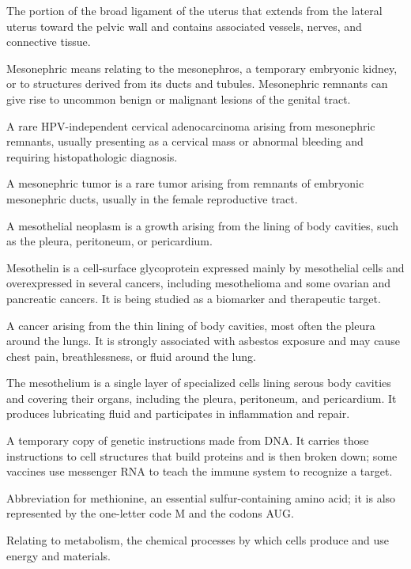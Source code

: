  The portion of the broad ligament of the uterus that extends from the lateral uterus toward the pelvic wall and contains associated vessels, nerves, and connective tissue.

 Mesonephric means relating to the mesonephros, a temporary embryonic kidney, or to structures derived from its ducts and tubules. Mesonephric remnants can give rise to uncommon benign or malignant lesions of the genital tract.

 A rare HPV-independent cervical adenocarcinoma arising from mesonephric remnants, usually presenting as a cervical mass or abnormal bleeding and requiring histopathologic diagnosis.

 A mesonephric tumor is a rare tumor arising from remnants of embryonic mesonephric ducts, usually in the female reproductive tract.

 A mesothelial neoplasm is a growth arising from the lining of body cavities, such as the pleura, peritoneum, or pericardium.

 Mesothelin is a cell-surface glycoprotein expressed mainly by mesothelial cells and overexpressed in several cancers, including mesothelioma and some ovarian and pancreatic cancers. It is being studied as a biomarker and therapeutic target.

 A cancer arising from the thin lining of body cavities, most often the pleura around the lungs. It is strongly associated with asbestos exposure and may cause chest pain, breathlessness, or fluid around the lung.

 The mesothelium is a single layer of specialized cells lining serous body cavities and covering their organs, including the pleura, peritoneum, and pericardium. It produces lubricating fluid and participates in inflammation and repair.

 A temporary copy of genetic instructions made from DNA. It carries those instructions to cell structures that build proteins and is then broken down; some vaccines use messenger RNA to teach the immune system to recognize a target.

 Abbreviation for methionine, an essential sulfur-containing amino acid; it is also represented by the one-letter code M and the codons AUG.

 Relating to metabolism, the chemical processes by which cells produce and use energy and materials.

